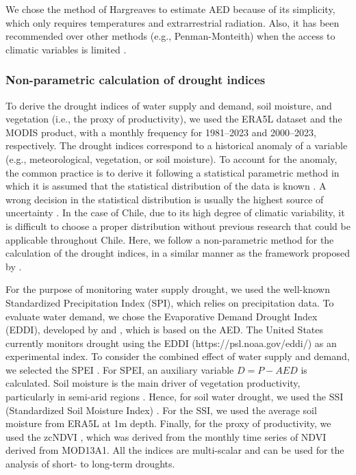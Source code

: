 \documentclass[
  authoryear,
  preprint,
  3p,
  onecolumn]{elsarticle}
\begin{document}
We chose the method of Hargreaves to estimate AED because of its
simplicity, which only requires temperatures and extrarrestrial
radiation. Also, it has been recommended over other methods (e.g.,
Penman-Monteith) when the access to climatic variables is limited
\citep{Vicente-Serrano2014}.

\hypertarget{non-parametric-calculation-of-drought-indices}{%
\subsubsection{Non-parametric calculation of drought
indices}\label{non-parametric-calculation-of-drought-indices}}

To derive the drought indices of water supply and demand, soil moisture,
and vegetation (i.e., the proxy of productivity), we used the ERA5L
dataset and the MODIS product, with a monthly frequency for 1981--2023
and 2000--2023, respectively. The drought indices correspond to a
historical anomaly of a variable (e.g., meteorological, vegetation, or
soil moisture). To account for the anomaly, the common practice is to
derive it following a statistical parametric method in which it is
assumed that the statistical distribution of the data is known
\citep{Heim2002}. A wrong decision in the statistical distribution is
usually the highest source of uncertainty \citep{Laimighofer2022}. In
the case of Chile, due to its high degree of climatic variability, it is
difficult to choose a proper distribution without previous research that
could be applicable throughout Chile. Here, we follow a non-parametric
method for the calculation of the drought indices, in a similar manner
as the framework proposed by \citet{Farahmand2015}.

For the purpose of monitoring water supply drought, we used the
well-known Standardized Precipitation Index (SPI), which relies on
precipitation data. To evaluate water demand, we chose the Evaporative
Demand Drought Index (EDDI), developed by \citet{Hobbins2016} and
\citet{McEvoy2016}, which is based on the AED. The United States
currently monitors drought using the EDDI (https://psl.noaa.gov/eddi/)
as an experimental index. To consider the combined effect of water
supply and demand, we selected the SPEI \citep{Vicente-Serrano2010}. For
SPEI, an auxiliary variable \(D=P-AED\) is calculated. Soil moisture is
the main driver of vegetation productivity, particularly in semi-arid
regions \citep{Li2022}. Hence, for soil water drought, we used the SSI
(Standardized Soil Moisture Index) \citep{Hao2013}. For the SSI, we used
the average soil moisture from ERA5L at 1m depth. Finally, for the proxy
of productivity, we used the zcNDVI \citep{Zambrano2018}, which was
derived from the monthly time series of NDVI derived from MOD13A1. All
the indices are multi-scalar and can be used for the analysis of short-
to long-term droughts.
\end{document}
